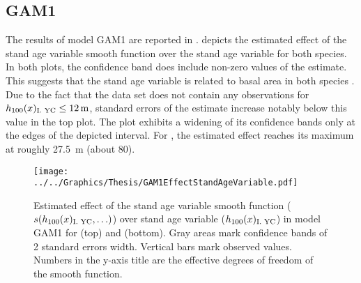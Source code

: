 \subsection{GAM1}

The results of model GAM1 are reported in .
 depicts the estimated effect of the stand age variable smooth function over the stand age variable for both species.
In both plots, the confidence band does include non-zero values of the estimate.  This suggests that the stand age variable is related to basal area in both species \parencite{Wood2001}.  Due to the fact that the \Beech{} data set does not contain any observations for \(h_{100}(x)_{\text{I. YC}}{} \leq \SI{12}{\meter}\), standard errors of the estimate increase notably below this value in the top plot.  The \Spruce{} plot exhibits a widening of its confidence bands only at the edges of the depicted interval.  For \Beech{}, the estimated effect reaches its maximum at roughly \SI{27.5}{\meter} (about \SI{80}{\year}).  %

\begin{figure}[h]
  \centering
  \texttt{[image: ../../Graphics/Thesis/GAM1EffectStandAgeVariable.pdf]}
  \caption{Estimated effect of the stand age variable smooth function (\(s(h_{100}(x)_{\text{I. YC}}{}, \ldots)\)) over stand age variable (\(h_{100}(x)_{\text{I. YC}}{}\)) in model GAM1 for \Beech{} (top) and \Spruce{} (bottom).  Gray areas mark confidence bands of 2 standard errors width.  Vertical bars mark observed values.  Numbers in the y-axis title are the effective degrees of freedom of the smooth function.}
  \label{fig:GAM1EffectStandAgeVariable}
\end{figure}

\clearpage{}


